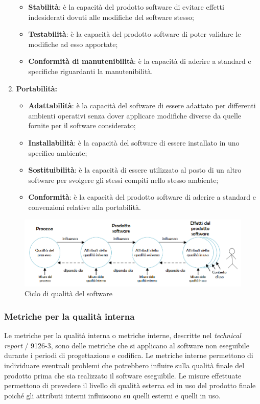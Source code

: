\begin{enumerate}
\begin{itemize}
      \item \textbf{Stabilità}: è la capacità del prodotto software di evitare effetti indesiderati dovuti alle modifiche del software stesso;
      \item \textbf{Testabilità}: è la capacità del prodotto software di poter validare le modifiche ad esso apportate;
      \item \textbf{Conformità di manutenibilità}: è la capacità di aderire a standard e specifiche riguardanti la manutenibilità.
    \end{itemize}
    \item \textbf{Portabilità:}
    \begin{itemize}
      \item \textbf{Adattabilità}: è la capacità del software di essere adattato per differenti ambienti operativi senza dover applicare modifiche diverse da quelle fornite per il software considerato;
      \item \textbf{Installabilità}: è la capacità del software di essere installato in uno specifico ambiente;
      \item \textbf{Sostituibilità}: è la capacità di essere utilizzato al posto di un altro software per svolgere gli stessi compiti nello stesso ambiente;
      \item \textbf{Conformità}: è la capacità del prodotto software di aderire a standard e convenzioni relative alla portabilità.
    \end{itemize}
  \end{enumerate}

  \begin{figure}[h]
    \includegraphics[width=1\textwidth]{res/sections/img/qdps.png}
    \caption{Ciclo di qualità del software}
    \centering
    \label{}
  \end{figure}

  \subsubsection{Metriche per la qualità interna}
    Le metriche per la qualità interna o metriche interne, descritte nel \emph{technical report} / 9126-3,
    sono delle metriche che si applicano al software non eseguibile durante i periodi di progettazione e codifica.
    Le metriche interne permettono di individuare eventuali problemi che potrebbero influire sulla qualità finale del prodotto prima che sia realizzato il software eseguibile.
    Le misure effettuate permettono di prevedere il livello di qualità esterna ed in uso del prodotto finale
    poiché gli attributi interni influiscono su quelli esterni e quelli in uso.\\

